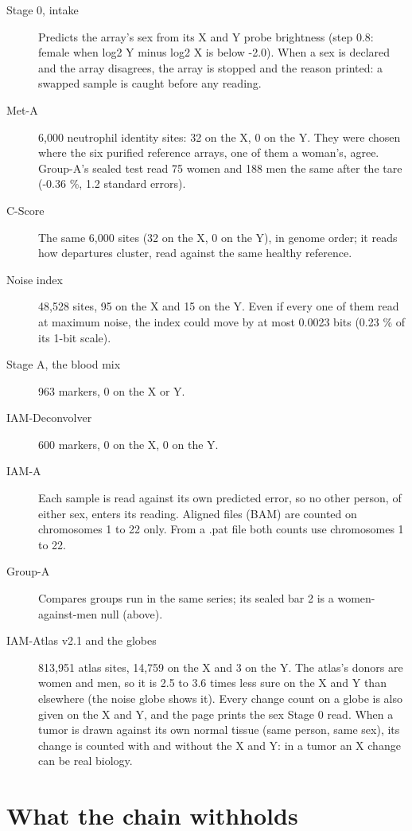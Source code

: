 \begin{description}
\item[Stage 0, intake] Predicts the array's sex from its X and Y probe brightness (step 0.8: female when log2 Y minus log2 X is below -2.0). When a sex is declared and the array disagrees, the array is stopped and the reason printed: a swapped sample is caught before any reading.
\item[Met-A] 6,000 neutrophil identity sites: 32 on the X, 0 on the Y. They were chosen where the six purified reference arrays, one of them a woman's, agree. Group-A's sealed test read 75 women and 188 men the same after the tare (-0.36 \%, 1.2 standard errors).
\item[C-Score] The same 6,000 sites (32 on the X, 0 on the Y), in genome order; it reads how departures cluster, read against the same healthy reference.
\item[Noise index] 48,528 sites, 95 on the X and 15 on the Y. Even if every one of them read at maximum noise, the index could move by at most 0.0023 bits (0.23 \% of its 1-bit scale).
\item[Stage A, the blood mix] 963 markers, 0 on the X or Y.
\item[IAM-Deconvolver] 600 markers, 0 on the X, 0 on the Y.
\item[IAM-A] Each sample is read against its own predicted error, so no other person, of either sex, enters its reading. Aligned files (BAM) are counted on chromosomes 1 to 22 only. From a .pat file both counts use chromosomes 1 to 22.
\item[Group-A] Compares groups run in the same series; its sealed bar 2 is a women-against-men null (above).
\item[IAM-Atlas v2.1 and the globes] 813,951 atlas sites, 14,759 on the X and 3 on the Y. The atlas's donors are women and men, so it is 2.5 to 3.6 times less sure on the X and Y than elsewhere (the noise globe shows it). Every change count on a globe is also given on the X and Y, and the page prints the sex Stage 0 read. When a tumor is drawn against its own normal tissue (same person, same sex), its change is counted with and without the X and Y: in a tumor an X change can be real biology.
\end{description}

\section{What the chain withholds}

